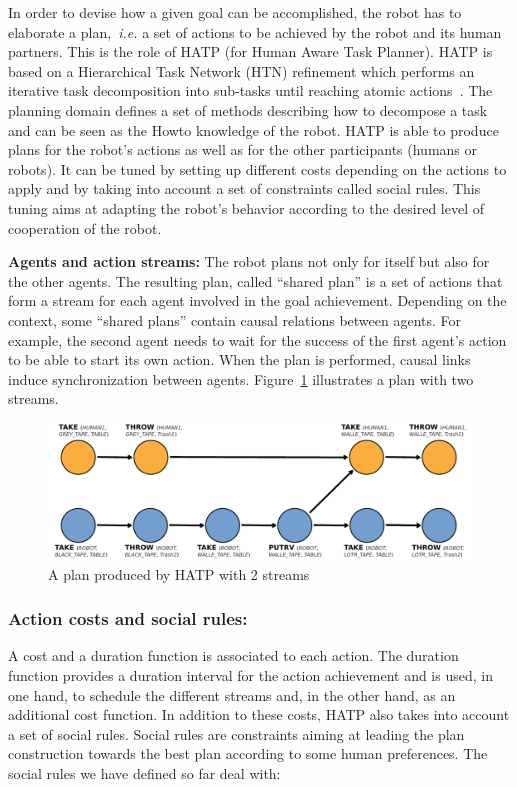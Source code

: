\documentclass{svmult}
\begin{document}
In order to devise how a given goal can be accomplished, the robot has
to elaborate a plan,~\textit{i.e.} a set of actions to be achieved by
the robot and its human partners.  This is the role of HATP
\cite{Alili2008} (for Human Aware Task Planner).  HATP is based on a
Hierarchical Task Network (HTN) refinement which performs an iterative
task decomposition into sub-tasks until reaching atomic
actions~\cite{Nau2003}.  The planning domain defines a set of methods
describing how to decompose a task and can be seen as the Howto
knowledge of the robot.  HATP is able to produce plans for the robot's
actions as well as for the other participants (humans or robots). It
can be tuned by setting up different costs depending on the actions to
apply and by taking into account a set of constraints called social
rules. This tuning aims at adapting the robot's behavior according to
the desired level of cooperation of the robot.

\vspace{0.3cm}
\noindent
\textbf{Agents and action streams:}
The robot plans not only for itself but also for the other agents. The
resulting plan, called ``shared plan'' is a set of actions that form
a stream for each agent involved in the goal achievement. Depending on
the context, some ``shared plans'' contain causal relations between
agents. For example, the second agent needs to wait for the success of
the first agent's action to be able to start its own action. When the
plan is performed, causal links induce synchronization between
agents. Figure~\ref{plan_hatp1} illustrates a plan with two streams.

\begin{figure}[htbp]
  \centering
  \includegraphics[width=0.95\columnwidth]{./figs/plan1.pdf}
  \caption{A plan produced by HATP with 2 streams}
  \label{plan_hatp1}
\end{figure}

\subsubsection{Action costs and social rules:}
A cost and a duration function is associated to each action.
The duration function provides a duration interval for the action
achievement and is used, in one hand, to schedule the different
streams and, in the other hand, as an additional cost function.
In addition to these costs, HATP also takes into account a set of social
rules.  Social rules are constraints aiming at leading the plan
construction towards the best plan according to some human
preferences. The social rules we have defined so far deal with:
\end{document}
